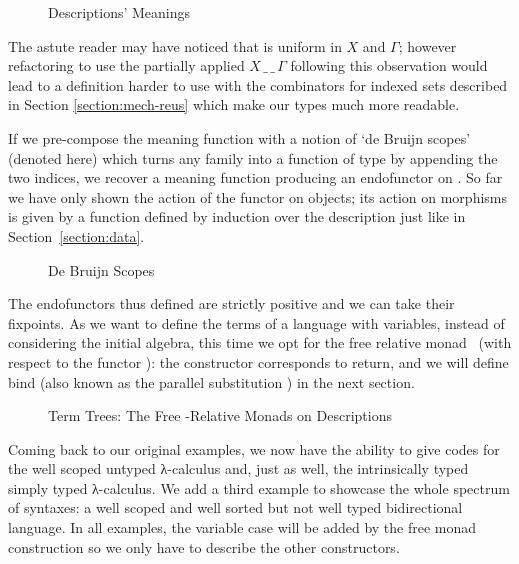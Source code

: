 \begin{figure}[h]
\caption{Descriptions' Meanings}\label{figure:syntaxmeaning}
\end{figure}

The astute reader may have noticed that  is uniform in $X$ and $\Gamma$; however
refactoring  to use the partially applied $X\,\_\,\_\,\Gamma$ following
this observation would lead to a definition harder to use with the
combinators for indexed sets described in Section \ref{section:mech-reus}
which make our types much more readable.

If we pre-compose the meaning function  with a notion of `de Bruijn scopes'
(denoted  here) which turns any   family into a function
of type      by appending the two
 indices, we recover a meaning function producing an endofunctor on
 . So far we have only shown the action of the functor on objects;
its action on morphisms is given by a function  defined by induction over
the description just like in Section~\ref{section:data}.

\begin{figure}[h]
\caption{De Bruijn Scopes}\label{figure:debruijnscope}
\end{figure}

The endofunctors thus defined are strictly positive and we can take their fixpoints.
As we want to define the terms of a language with variables, instead of
considering the initial algebra, this time we opt for the free relative
monad~\cite{JFR4389} (with respect to the functor ): the 
constructor corresponds to return, and we will define bind (also known as
the parallel substitution ) in the next section.


\begin{figure}[h]
\caption{Term Trees: The Free -Relative Monads on Descriptions}\label{figure:freemonad}
\end{figure}

Coming back to our original examples, we now have the ability to give
codes for the well scoped untyped λ-calculus and, just as well,
the intrinsically typed simply typed λ-calculus. We add a third
example to showcase the whole spectrum of syntaxes: a well scoped and
well sorted but not well typed bidirectional language. In all examples,
the variable case will be added by the free monad construction so we only
have to describe the other constructors.



